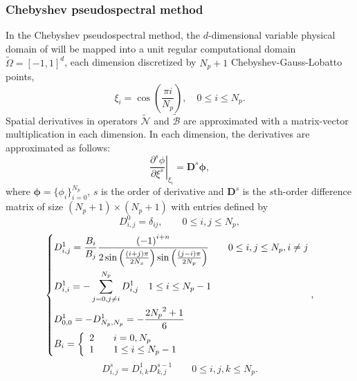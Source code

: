 \documentclass[preprint, 10pt]{elsarticle}
\begin{document}
\subsubsection{Chebyshev pseudospectral method}
In the Chebyshev pseudospectral method, the $d$-dimensional variable physical domain of  will be mapped into a unit regular computational domain $\widetilde \Omega =[-1,1]^d$,  each dimension discretized by  $N_p+1$ Chebyshev-Gauss-Lobatto points,
\begin{equation}
\xi_i=\cos \left( \frac{\pi i}{N_p} \right), \quad 0 \le i \le {N_p}.
\label{eq_CollocationPoints}
\end{equation}
Spatial derivatives in operators $\widetilde {\mathcal{N}}$ and $\widetilde {\mathcal{B}}$ are approximated with a matrix-vector multiplication in each dimension. In each dimension, the derivatives are approximated as follows:
\begin{equation}
\left. { \frac{\partial^s    \phi}{{\partial \xi^s}  }} \right|_{\xi _i }
 = \mathbf{D}^s \pmb{\phi},
\end{equation}
where $\pmb{\phi}=\{\phi _i\}_{i=0}^{N_p}$, $s$ is the order of derivative and $\mathbf{D}^s$ is the $s$th-order difference matrix of size ${(N_p+1)\times (N_p+1)}$ with entries defined by
\begin{equation}
D^0_{i,j} = \delta_{ij}, \qquad 0 \le i,j \le {N_p},
\label{eq_D0}
\end{equation}
\begin{equation}
\left\{ \begin{aligned}
&D_{i,j}^1 = \frac{{{B_i}}}{{{B_j}}}\frac{{{{( - 1)}^{i + n}}}}{{2\sin \left( {\frac{{(i + j)\pi }}{{2{N_x}}}} \right)\sin \left( {\frac{{(j - i)\pi }}{{2{N_p}}}} \right)}} \qquad 0 \le i,j \le {N_p},i \ne j\\
&D_{i,i}^1 =  - \sum\limits_{j = 0,j \ne i}^{{N_p}} {D_{i,j}^1} \quad 1 \le i \le {N_p} - 1\\
&D_{0,0}^1 =  - D_{{N_p},{N_p}}^1 =  - \frac{{2{N_p}^2 + 1}}{6}{\rm{                       }}\\
&{B_i} = \left\{
                 \begin{array}{*{20}{l}}
                      2 \qquad i=0, N_p \\
                      1 \qquad 1 \le i \le {N_p-1}
                 \end{array}
                 \right.
\end{aligned} \right. ,
\label{eq_D1}
\end{equation}
\begin{equation}
D^s_{i,j} = D^{1}_{i,k}D^{s-1}_{k,j} \qquad 0 \le i,j,k \le {N_p}.
\label{eq_Ds}
\end{equation}
\end{document}
